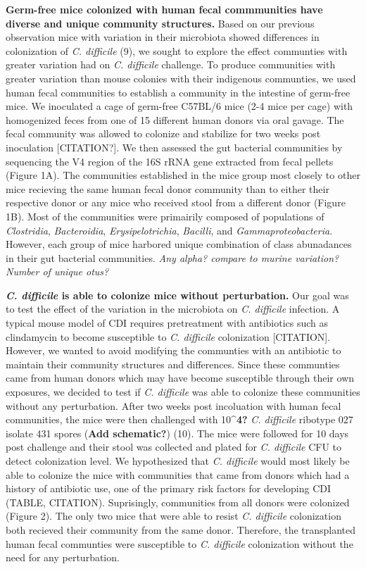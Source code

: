 \documentclass[
  12pt,
]{article}
\begin{document}
\textbf{Germ-free mice colonized with human fecal commmunities have
diverse and unique community structures.} Based on our previous
observation mice with variation in their microbiota showed differences
in colonization of \emph{C. difficile} (9), we sought to explore the
effect communties with greater variation had on \emph{C. difficile}
challenge. To produce communities with greater variation than mouse
colonies with their indigenous communties, we used human fecal
communities to establish a community in the intestine of germ-free mice.
We inoculated a cage of germ-free C57BL/6 mice (2-4 mice per cage) with
homogenized feces from one of 15 different human donors via oral gavage.
The fecal community was allowed to colonize and stabilize for two weeks
post inoculation {[}CITATION?{]}. We then assessed the gut bacterial
communities by sequencing the V4 region of the 16S rRNA gene extracted
from fecal pellets (Figure 1A). The communities established in the mice
group most closely to other mice recieving the same human fecal donor
community than to either their respective donor or any mice who received
stool from a different donor (Figure 1B). Most of the communities were
primairily composed of populations of \emph{Clostridia},
\emph{Bacteroidia}, \emph{Erysipelotrichia}, \emph{Bacilli}, and
\emph{Gammaproteobacteria}. However, each group of mice harbored unique
combination of class abunadances in their gut bacterial communities.
\emph{Any alpha? compare to murine variation? Number of unique otus?}

\textbf{\emph{C. difficile} is able to colonize mice without
perturbation.} Our goal was to test the effect of the variation in the
microbiota on \emph{C. difficile} infection. A typical mouse model of
CDI requires pretreatment with antibiotics such as clindamycin to become
susceptible to \emph{C. difficile} colonization {[}CITATION{]}. However,
we wanted to avoid modifying the communties with an antibiotic to
maintain their community structures and differences. Since these
communties came from human donors which may have become susceptible
through their own exposures, we decided to test if \emph{C. difficile}
was able to colonize these communities without any perturbation. After
two weeks post incoluation with human fecal communities, the mice were
then challenged with 10\^{}\textbf{4?} \emph{C. difficile} ribotype 027
isolate 431 spores (\textbf{Add schematic?}) (10). The mice were
followed for 10 days post challenge and their stool was collected and
plated for \emph{C. difficile} CFU to detect colonization level. We
hypothesized that \emph{C. difficile} would most likely be able to
colonize the mice with communities that came from donors which had a
history of antibiotic use, one of the primary risk factors for
developing CDI (TABLE, CITATION). Suprisingly, communities from all
donors were colonized (Figure 2). The only two mice that were able to
resist \emph{C. difficile} colonization both recieved their community
from the same donor. Therefore, the transplanted human fecal communties
were susceptible to \emph{C. difficile} colonization without the need
for any perturbation.
\end{document}
